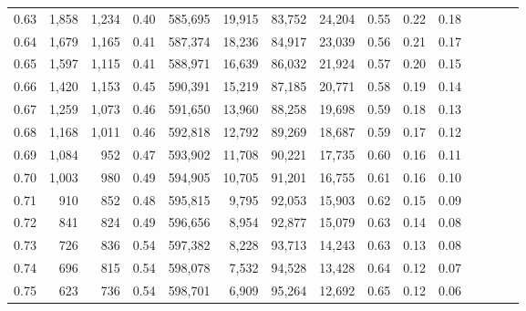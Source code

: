 \begin{tabular}{rrrcrrrrrrrrrrr}
0.63 &   1,858 &  1,234 &                                       0.40 &  585,695 &   19,915 &   83,752 &   24,204 &  0.55 &  0.22 &                         0.18 \\
0.64 &   1,679 &  1,165 &                                       0.41 &  587,374 &   18,236 &   84,917 &   23,039 &  0.56 &  0.21 &                         0.17 \\
0.65 &   1,597 &  1,115 &                                       0.41 &  588,971 &   16,639 &   86,032 &   21,924 &  0.57 &  0.20 &                         0.15 \\
0.66 &   1,420 &  1,153 &                                       0.45 &  590,391 &   15,219 &   87,185 &   20,771 &  0.58 &  0.19 &                         0.14 \\
0.67 &   1,259 &  1,073 &                                       0.46 &  591,650 &   13,960 &   88,258 &   19,698 &  0.59 &  0.18 &                         0.13 \\
0.68 &   1,168 &  1,011 &                                       0.46 &  592,818 &   12,792 &   89,269 &   18,687 &  0.59 &  0.17 &                         0.12 \\
0.69 &   1,084 &    952 &                                       0.47 &  593,902 &   11,708 &   90,221 &   17,735 &  0.60 &  0.16 &                         0.11 \\
0.70 &   1,003 &    980 &                                       0.49 &  594,905 &   10,705 &   91,201 &   16,755 &  0.61 &  0.16 &                         0.10 \\
0.71 &     910 &    852 &                                       0.48 &  595,815 &    9,795 &   92,053 &   15,903 &  0.62 &  0.15 &                         0.09 \\
0.72 &     841 &    824 &                                       0.49 &  596,656 &    8,954 &   92,877 &   15,079 &  0.63 &  0.14 &                         0.08 \\
0.73 &     726 &    836 &                                       0.54 &  597,382 &    8,228 &   93,713 &   14,243 &  0.63 &  0.13 &                         0.08 \\
0.74 &     696 &    815 &                                       0.54 &  598,078 &    7,532 &   94,528 &   13,428 &  0.64 &  0.12 &                         0.07 \\
0.75 &     623 &    736 &                                       0.54 &  598,701 &    6,909 &   95,264 &   12,692 &  0.65 &  0.12 &                         0.06 \\

\end{tabular}
